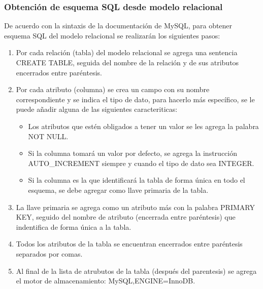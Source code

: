 \subsubsection{Obtención de esquema SQL desde modelo relacional}


De acuerdo con la sintaxis de la documentación de MySQL\cite{mysql_mysql_2020}, para obtener esquema SQL del modelo relacional se realizarán los siguientes pasos:

\begin{enumerate}
  \item Por cada relación (tabla) del modelo relacional se agrega una sentencia CREATE TABLE, seguida del nombre de la relación y de sus atributos encerrados entre paréntesis.
  \item Por cada atributo (columna) se crea un campo con su nombre correspondiente y se indica el tipo de dato, para hacerlo más específico, se le puede añadir alguna de las siguientes caracteriticas:
  \begin{itemize}
    \item Los atributos que estén obligados a tener un valor se les agrega la palabra NOT NULL.
    \item Si la columna tomará un valor por defecto, se agrega la instrucción AUTO\_INCREMENT siempre y cuando el tipo de dato sea INTEGER.
    \item Si la columna es la que identificará la tabla de forma única en todo el esquema, se debe agregar como llave primaria de la tabla.
  \end{itemize}
  \item La llave primaria se agrega como un atributo más con la palabra PRIMARY KEY, seguido del nombre de atributo (encerrada entre paréntesis) que indentifica de forma única a la tabla.
  \item Todos los atributos de la tabla se encuentran encerrados entre paréntesis separados por comas.
  \item Al final de la lista de atrubutos de la tabla (después del parentesis) se agrega el motor de almacenamiento: MySQL,ENGINE=InnoDB.
\end{enumerate}
